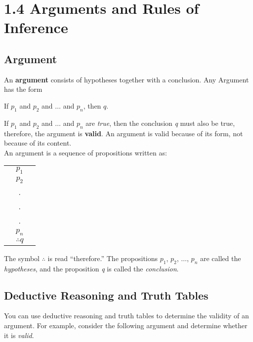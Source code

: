 \section*{1.4 Arguments and Rules of Inference}

\subsection*{Argument}

An \textbf{argument} consists of hypotheses together with a conclusion.  Any Argument has the form

\begin{center}
    If $p_1$ and $p_2$ and $\dots$ and $p_n$, then $q$.
\end{center}

If $p_1$ and $p_2$ and $\dots$ and $p_n$ are \textit{true}, then the conclusion \textit{q} must also be true, therefore, the argument is \textbf{valid}.  An argument is valid because of its form, not because of its content.\\

An argument is a sequence of propositions written as:

\begin{table}[h]
\centering
\begin{tabular}{ccc}
  & $p_1$ & \\
  & $p_2$ & \\
  & . & \\
  & . & \\
  & . & \\
  & $p_n$ & \\
\hline
  & $\therefore q$ &
\end{tabular}
\end{table}

The symbol $\therefore$ is read ``therefore.''  The propositions $p_1$, $p_2$, $\dots$, $p_n$ are called the \textit{hypotheses}, and the proposition \textit{q} is called the \textit{conclusion}.\\

\subsection*{Deductive Reasoning and Truth Tables}

You can use deductive reasoning and truth tables to determine the validity of an argument.  For example, consider the following argument and determine whether it is \textit{valid}.

